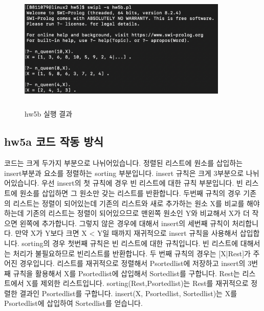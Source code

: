\documentclass{article}
\begin{document}
\begin{figure}[h]
    \centering
    \includegraphics[width = 10cm,height = 6cm]{hw5b_run.png}
    \caption{hw5b 실행 결과}
    \label{fig:fig1}
\end{figure}
\subsection{hw5a 코드 작동 방식}
코드는 크게 두가지 부분으로 나뉘어있습니다. 정렬된 리스트에 원소를 삽입하는 insert부분과 요소를 정렬하는 sorting 부분입니다. insert 규칙은 크게 3부분으로 나뉘어있습니다. 우선 insert의 첫 규칙에 경우 빈 리스트에 대한 규칙 부분입니다. 빈 리스트에 원소를 삽입하면 그 원소만 갖는 리스트를 반환합니다. 두번째 규칙의 경우 기존의 리스트는 정렬이 되어있는데 기존의 리스트와 새로 추가하는 원소 X를 비교를 해야하는데 기존의 리스트는 정렬이 되어있으므로 맨왼쪽 원소인 Y와 비교해서 X가 더 작으면 왼쪽에 추가합니다. 그렇지 않은 경우에 대해서 insert의 세번째 규칙이 처리합니다. 만약 X가 Y보다 크면 X < Y일 때까지 재귀적으로 insert 규칙을 사용해서 삽입합니다. sorting의 경우 첫번째 규칙은 빈 리스트에 대한 규칙입니다. 빈 리스트에 대해서는 처리가 불필요하므로 빈리스트를 반환합니다. 두 번째 규칙의 경우는 [X|Rest]가 주어진 경우입니다. 리스트를 재귀적으로 정렬해서 Psortedlist에 저장하고 insert의 3번째 규칙을 활용해서 X를 Psortedlist에 삽입해서 Sortedlist를 구합니다. Rest는 리스트에서 X를 제외한 리스트입니다. sorting(Rest,Psortedlist)는 Rest를 재귀적으로 정렬한 결과인 Psortedlist를 구합니다. insert(X, Psortedlist, Sortedlist)는 X를 Psortedlist에 삽입하여 Sortedlist를 얻습니다. 
\end{document}
